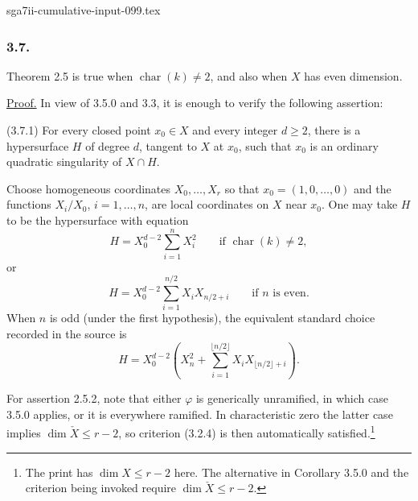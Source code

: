 \begin{filecontents*}{sga7ii-cumulative-input-099.tex}
\subsubsection*{3.7.}
Theorem 2.5 is true when $\operatorname{char}(k)\ne2$, and also when
$X$ has even dimension.

\noindent\underline{Proof.}
In view of 3.5.0 and 3.3, it is enough to verify the following
assertion:

\medskip
\noindent(3.7.1) For every closed point $x_0\in X$ and every integer
$d\geq2$, there is a hypersurface $H$ of degree $d$, tangent to $X$
at $x_0$, such that $x_0$ is an ordinary quadratic singularity of
$X\cap H$.

Choose homogeneous coordinates $X_0,\ldots,X_r$ so that
$x_0=(1,0,\ldots,0)$ and the functions $X_i/X_0$, $i=1,\ldots,n$,
are local coordinates on $X$ near $x_0$.  One may take $H$ to be the
hypersurface with equation
\begin{equation}\tag{3.7.1.1}
H=X_0^{d-2}\sum_{i=1}^{n}X_i^2
\qquad\text{if }\operatorname{char}(k)\ne2,
\end{equation}
or
\begin{equation}\tag{3.7.1.2}
H=X_0^{d-2}\sum_{i=1}^{n/2}X_iX_{n/2+i}
\qquad\text{if }n\text{ is even}.
\end{equation}
When $n$ is odd (under the first hypothesis), the equivalent standard
choice recorded in the source is
\begin{equation}\tag{3.7.1.3}
H=X_0^{d-2}
\left(X_n^2+
\sum_{i=1}^{\lfloor n/2\rfloor}
X_iX_{\lfloor n/2\rfloor+i}\right).
\end{equation}

For assertion 2.5.2, note that either $\varphi$ is generically
unramified, in which case 3.5.0 applies, or it is everywhere ramified.
In characteristic zero the latter case implies
$\dim\check X\leq r-2$, so criterion (3.2.4) is then automatically
satisfied.\footnote{The print has $\dim X\leq r-2$ here.  The
alternative in Corollary 3.5.0 and the criterion being invoked require
$\dim\check X\leq r-2$.}
\end{filecontents*}

